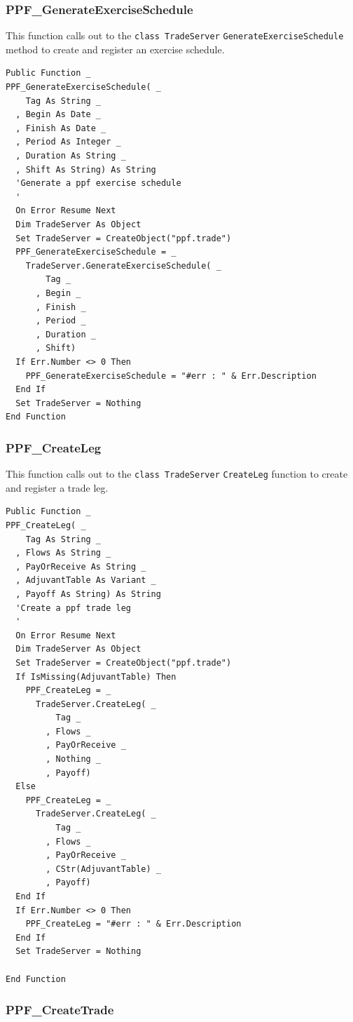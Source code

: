 \subsubsection{PPF\_GenerateExerciseSchedule}

This function calls out to the \verb|class TradeServer|
\verb|GenerateExerciseSchedule| method to create and register an
exercise schedule.
\begin{verbatim}
Public Function _
PPF_GenerateExerciseSchedule( _
    Tag As String _
  , Begin As Date _
  , Finish As Date _
  , Period As Integer _
  , Duration As String _
  , Shift As String) As String
  'Generate a ppf exercise schedule
  '
  On Error Resume Next
  Dim TradeServer As Object
  Set TradeServer = CreateObject("ppf.trade")
  PPF_GenerateExerciseSchedule = _
    TradeServer.GenerateExerciseSchedule( _
        Tag _
      , Begin _
      , Finish _
      , Period _
      , Duration _
      , Shift)
  If Err.Number <> 0 Then
    PPF_GenerateExerciseSchedule = "#err : " & Err.Description
  End If
  Set TradeServer = Nothing
End Function
\end{verbatim}

\subsubsection{PPF\_CreateLeg}

This function calls out to the \verb|class TradeServer|
\verb|CreateLeg| function to create and register a trade leg.
\begin{verbatim}
Public Function _
PPF_CreateLeg( _
    Tag As String _
  , Flows As String _
  , PayOrReceive As String _
  , AdjuvantTable As Variant _
  , Payoff As String) As String
  'Create a ppf trade leg
  '
  On Error Resume Next
  Dim TradeServer As Object
  Set TradeServer = CreateObject("ppf.trade")
  If IsMissing(AdjuvantTable) Then
    PPF_CreateLeg = _
      TradeServer.CreateLeg( _
          Tag _
        , Flows _
        , PayOrReceive _
        , Nothing _
        , Payoff)
  Else
    PPF_CreateLeg = _
      TradeServer.CreateLeg( _
          Tag _
        , Flows _
        , PayOrReceive _
        , CStr(AdjuvantTable) _
        , Payoff)
  End If
  If Err.Number <> 0 Then
    PPF_CreateLeg = "#err : " & Err.Description
  End If
  Set TradeServer = Nothing

End Function
\end{verbatim}

\subsubsection{PPF\_CreateTrade}

